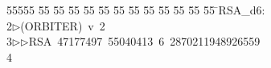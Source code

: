%
%
\begin{tabbing}
55555 \= 55 \= 55 \= 55 \= 55 \= 55 \= 55 \= 55 \= 55 \= 55 \= 55 \= 55 \= 55 \= \>RSA\_d6:\\[0pt]
2\>$\triangleright$\>(ORBITER)\ v\ 2\ \\[0pt]
3\>$\triangleright$\>$\triangleright$\>RSA\ 47177497\ 55040413\ 6\ 2870211948926559\\[0pt]
4\>\end{tabbing}
